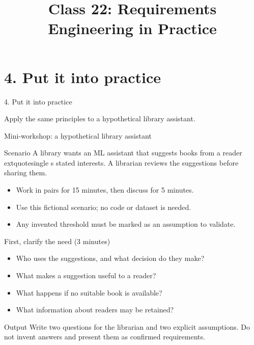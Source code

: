 \ifdefined\requirementspracticefragment\else

\title{Class 22: Requirements Engineering in Practice}
\author{\coursename}
\date{}

\frame{\titlepage \coursefooter}
\fi

\section{4. Put it into practice}
\begin{frame}[c]
\centering
{4. Put it into practice\par}
\vspace{1em}
Apply the same principles to a hypothetical library assistant.
\end{frame}

\begin{frame}{Mini-workshop: a hypothetical library assistant}
\begin{block}{Scenario}
A library wants an ML assistant that suggests books from a reader	extquotesingle s stated interests. A librarian reviews the suggestions before sharing them.
\end{block}
\begin{itemize}
\item Work in pairs for 15 minutes, then discuss for 5 minutes.
\item Use this fictional scenario; no code or dataset is needed.
\item Any invented threshold must be marked as an assumption to validate.
\end{itemize}
\coursefooter
\end{frame}

\begin{frame}{First, clarify the need (3 minutes)}
\begin{itemize}
\item Who uses the suggestions, and what decision do they make?
\item What makes a suggestion useful to a reader?
\item What happens if no suitable book is available?
\item What information about readers may be retained?
\end{itemize}\begin{block}{Output}
Write two questions for the librarian and two explicit assumptions. Do not invent answers and present them as confirmed requirements.
\end{block}
\coursefooter
\end{frame}

